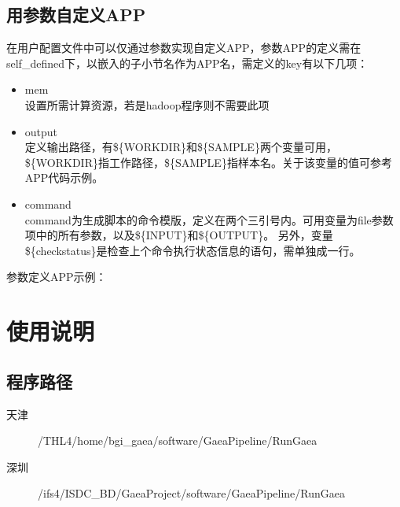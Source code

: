 \documentclass[UTF8,10pt,a4paper]{ctexart}
\begin{document}
\subsection{用参数自定义APP}
在用户配置文件中可以仅通过参数实现自定义APP，参数APP的定义需在self\_defined下，以嵌入的子小节名作为APP名，需定义的key有以下几项：
\begin{itemize}
\item mem\\
设置所需计算资源，若是hadoop程序则不需要此项
\item output\\
定义输出路径，有\$\{WORKDIR\}和\$\{SAMPLE\}两个变量可用，\$\{WORKDIR\}指工作路径，\$\{SAMPLE\}指样本名。关于该变量的值可参考APP代码示例。
\item command\\
command为生成脚本的命令模版，定义在两个三引号内。可用变量为file参数项中的所有参数，以及\$\{INPUT\}和\$\{OUTPUT\}。
另外，变量\$\{checkstatus\}是检查上个命令执行状态信息的语句，需单独成一行。
\end{itemize}


参数定义APP示例：



%

\section{使用说明}
%

\subsection{程序路径}
\begin{description}
\item[ 天津] /THL4/home/bgi\_gaea/software/GaeaPipeline/RunGaea
\item[ 深圳] /ifs4/ISDC\_BD/GaeaProject/software/GaeaPipeline/RunGaea
\end{description}
\end{document}
